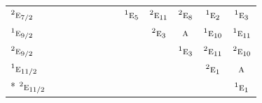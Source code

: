 \documentclass[10pt,a4paper]{article}
\numberwithin{equation}{section}
\newcommand{\irr}[1]{\text{\normalfont\scshape #1}}
\newcommand{\conjpair}[1]{{}^{#1}}
\begin{document}
{\begin{longtable}{@{}lcccccccccccc@{}}
$\conjpair{2}\irr{e}_{7/2}$ &  &  &  &  &  &  &  & $\conjpair{1}\irr{e}_{5}$ & $\conjpair{2}\irr{e}_{11}$ & $\conjpair{2}\irr{e}_{8}$ & $\conjpair{1}\irr{e}_{2}$ & $\conjpair{1}\irr{e}_{3}$\\
$\conjpair{1}\irr{e}_{9/2}$ &  &  &  &  &  &  &  &  & $\conjpair{2}\irr{e}_{3}$ & $\irr{a}$ & $\conjpair{1}\irr{e}_{10}$ & $\conjpair{1}\irr{e}_{11}$\\
$\conjpair{2}\irr{e}_{9/2}$ &  &  &  &  &  &  &  &  &  & $\conjpair{1}\irr{e}_{3}$ & $\conjpair{2}\irr{e}_{11}$ & $\conjpair{2}\irr{e}_{10}$\\
$\conjpair{1}\irr{e}_{11/2}$ &  &  &  &  &  &  &  &  &  &  & $\conjpair{2}\irr{e}_{1}$ & $\irr{a}$\\*
$\conjpair{2}\irr{e}_{11/2}$ &  &  &  &  &  &  &  &  &  &  &  & $\conjpair{1}\irr{e}_{1}$\\
\bottomrule\end{longtable}}
\end{document}
